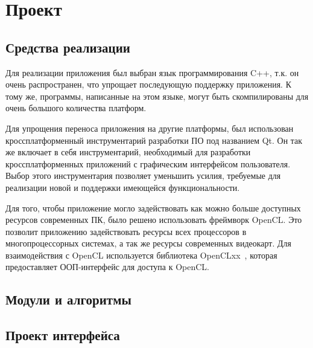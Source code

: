 \section{Проект}
\subsection{Средства реализации}
Для реализации приложения был выбран язык программирования C++, т.к. он очень распространен, что упрощает последующую поддержку приложения. К тому же, программы, написанные на этом языке, могут быть скомпилированы для очень большого количества платформ.

Для упрощения переноса приложения на другие платформы, был использован кроссплатформенный инструментарий разработки ПО под названием Qt. Он так же включает в себя инструментарий, необходимый для разработки кроссплатформенных приложений с графическим интерфейсом пользователя. Выбор этого инструментария позволяет уменьшить усилия, требуемые для реализации новой и поддержки имеющейся функциональности.

Для того, чтобы приложение могло задействовать как можно больше доступных ресурсов современных ПК, было решено использовать фреймворк OpenCL. Это позволит приложению задействовать ресурсы всех процессоров в многопроцессорных системах, а так же ресурсы современных видеокарт.
Для взаимодействия с OpenCL используется библиотека OpenCLxx~\cite{opencl_openclxx}, которая предоставляет ООП-интерфейс для доступа к OpenCL.

\subsection{Модули и алгоритмы}

\subsection{Проект интерфейса}

